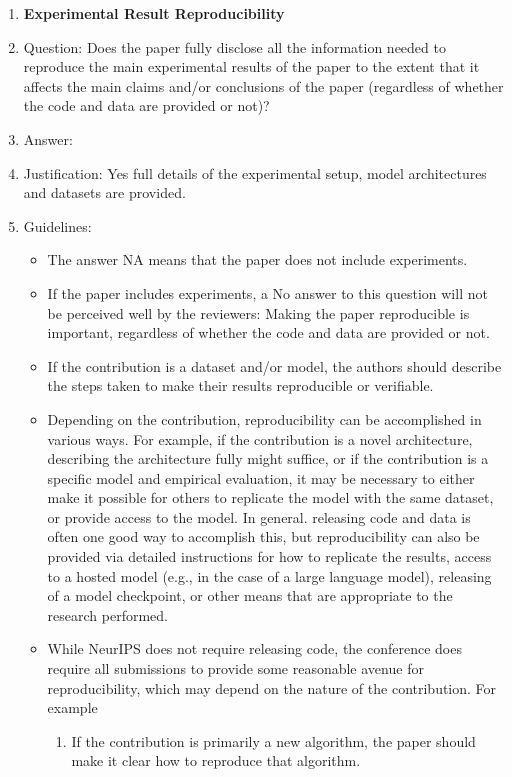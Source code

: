 \documentclass[letterpaper]{article}
\begin{document}
\begin{enumerate}
    \item {\bf Experimental Result Reproducibility}
    \item[] Question: Does the paper fully disclose all the information needed to reproduce the main experimental results of the paper to the extent that it affects the main claims and/or conclusions of the paper (regardless of whether the code and data are provided or not)?
    \item[] Answer: \answerYes{} %
    \item[] Justification: Yes full details of the experimental setup, model architectures and datasets are provided. 
    \item[] Guidelines:
    \begin{itemize}
        \item The answer NA means that the paper does not include experiments.
        \item If the paper includes experiments, a No answer to this question will not be perceived well by the reviewers: Making the paper reproducible is important, regardless of whether the code and data are provided or not.
        \item If the contribution is a dataset and/or model, the authors should describe the steps taken to make their results reproducible or verifiable. 
        \item Depending on the contribution, reproducibility can be accomplished in various ways. For example, if the contribution is a novel architecture, describing the architecture fully might suffice, or if the contribution is a specific model and empirical evaluation, it may be necessary to either make it possible for others to replicate the model with the same dataset, or provide access to the model. In general. releasing code and data is often one good way to accomplish this, but reproducibility can also be provided via detailed instructions for how to replicate the results, access to a hosted model (e.g., in the case of a large language model), releasing of a model checkpoint, or other means that are appropriate to the research performed.
        \item While NeurIPS does not require releasing code, the conference does require all submissions to provide some reasonable avenue for reproducibility, which may depend on the nature of the contribution. For example
        \begin{enumerate}
            \item If the contribution is primarily a new algorithm, the paper should make it clear how to reproduce that algorithm.

\end{enumerate}
\end{itemize}
\end{enumerate}
\end{document}
